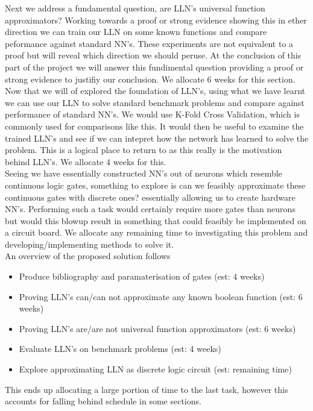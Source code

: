 \documentclass[11pt, a4paper, twoside, openright]{report}
\begin{document}
Next we address a fundamental question, are LLN's universal function approximators? Working towards a proof or strong evidence showing this in ether direction we can train our LLN on some known functions and compare peformance against standard NN's. These experiments are not equivalent to a proof but will reveal which direction we should peruse. At the conclusion of this part of the project we will answer this fundimental question providing a proof or strong evidence to justifiy our conclusion. We allocate 6 weeks for this section. \\

Now that we will of explored the foundation of LLN's, using what we have learnt we can use our LLN to solve standard benchmark problems and compare against performance of standard NN's. We would use K-Fold Cross Validation, which is commonly used for comparisons like this. It would then be useful to examine the trained LLN's and see if we can intepret how the network has learned to solve the problem. This is a logical place to return to as this really is the motivation behind LLN's. We allocate 4 weeks for this. \\

Seeing we have essentially constructed NN's out of neurons which resemble continuous logic gates, something to explore is can we feasibly approximate these continuous gates with discrete ones? essentially allowing us to create hardware NN's. Performing such a task would certainly require more gates than neurons but would this blowup result in something that could feasibly be implemented on a circuit board. We allocate any remaining time to investigating this problem and developing/implementing methods to solve it.\\

An overview of the proposed solution follows
\begin{itemize}
\item Produce bibliography and paramaterisation of gates (est: 4 weeks)
\item Proving LLN's can/can not approximate any known boolean function (est: 6 weeks)
\item Proving LLN's are/are not universal function approximators (est: 6 weeks)
\item Evaluate LLN's on benchmark problems (est: 4 weeks)
\item Explore approximating LLN as discrete logic circuit (est: remaining time)
\end{itemize}
This ends up allocating a large portion of time to the last task, however this accounts for falling behind schedule in some sections.
\end{document}
